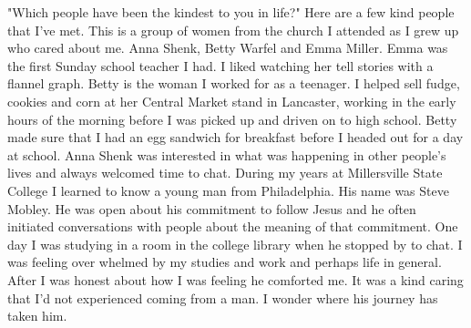 "Which people have been the kindest to you in life?"
Here are a few kind people that I've met.
This is a group of women from the church I attended as I grew up who cared about me. Anna Shenk, Betty Warfel and Emma Miller. Emma was the first Sunday school teacher I had. I liked watching her tell stories with a flannel graph. Betty is the woman I worked for as a teenager. I helped sell fudge, cookies and corn at her Central Market stand in Lancaster, working in the early hours of the morning before I was picked up and driven on to high school. Betty made sure that I had an egg sandwich for breakfast before I headed out for a day at school. Anna Shenk was interested in what was happening in other people's lives and always welcomed time to chat.
 During my years at Millersville State College I learned to know a young man from Philadelphia. His name was Steve Mobley. He was open about his commitment to follow Jesus and he often initiated conversations with people about the meaning of that commitment. One day I was studying in a room in the college library when he stopped by to chat. I was feeling over whelmed by my studies and work and perhaps life in general. After I was honest about how I was feeling he comforted me. It was a kind caring that I'd not experienced coming from a man. I wonder where his journey has taken him.





